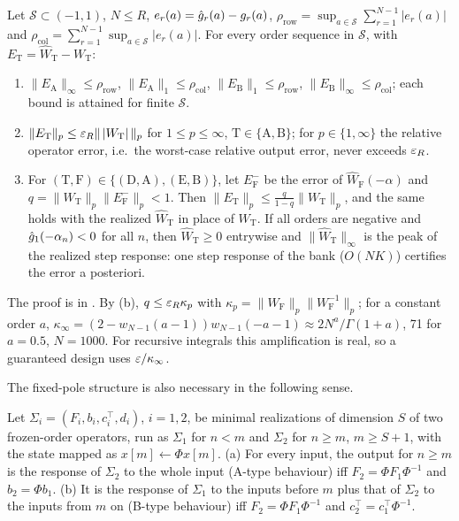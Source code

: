 \begin{theorem}\label{thm:opnorm}
Let $\mathcal S\subset(-1,1)$, $N\le R$, $e_r(a)=\hat g_r(a)-g_r(a)$, $\rho_{\mathrm{row}}=\sup_{a\in\mathcal S}\sum_{r=1}^{N-1}|e_r(a)|$ and $\rho_{\mathrm{col}}=\sum_{r=1}^{N-1}\sup_{a\in\mathcal S}|e_r(a)|$. For every order sequence in $\mathcal S$, with $E_{\mathrm T}=\hat W_{\mathrm T}-W_{\mathrm T}$:
\begin{enumerate}
\item[(a)] $\|E_{\mathrm A}\|_\infty\le\rho_{\mathrm{row}}$, $\|E_{\mathrm A}\|_1\le\rho_{\mathrm{col}}$, $\|E_{\mathrm B}\|_1\le\rho_{\mathrm{row}}$, $\|E_{\mathrm B}\|_\infty\le\rho_{\mathrm{col}}$; each bound is attained for finite $\mathcal S$.
\item[(b)] $\|E_{\mathrm T}\|_p\le\varepsilon_R\|\,|W_{\mathrm T}|\,\|_p$ for $1\le p\le\infty$, $\mathrm T\in\{\mathrm A,\mathrm B\}$; for $p\in\{1,\infty\}$ the relative operator error, i.e.\ the worst-case relative output error, never exceeds $\varepsilon_R$.
\item[(c)] For $(\mathrm T,\mathrm F)\in\{(\mathrm D,\mathrm A),(\mathrm E,\mathrm B)\}$, let $E^-_{\mathrm F}$ be the error of $\hat W_{\mathrm F}(-\alpha)$ and $q=\|W_{\mathrm T}\|_p\|E^-_{\mathrm F}\|_p<1$. Then $\|E_{\mathrm T}\|_p\le\frac{q}{1-q}\|W_{\mathrm T}\|_p$, and the same holds with the realized $\hat W_{\mathrm T}$ in place of $W_{\mathrm T}$. If all orders are negative and $\hat g_1(-\alpha_n)<0$ for all $n$, then $\hat W_{\mathrm T}\ge0$ entrywise and $\|\hat W_{\mathrm T}\|_\infty$ is the peak of the realized step response: one step response of the bank ($O(NK)$) certifies the error a posteriori.
\end{enumerate}
\end{theorem}

The proof is in . By (b), $q\le\varepsilon_R\kappa_p$ with $\kappa_p=\|W_{\mathrm F}\|_p\|W_{\mathrm F}^{-1}\|_p$; for a constant order $a$, $\kappa_\infty=(2-w_{N-1}(a-1))w_{N-1}(-a-1)\approx2N^a/\Gamma(1+a)$, 71 for $a=0.5$, $N=1000$. For recursive integrals this amplification is real, so a guaranteed design uses $\varepsilon/\kappa_\infty$.

The fixed-pole structure is also necessary in the following sense.

\begin{theorem}[Necessity]\label{thm:necessity}
Let $\Sigma_i=(F_i,b_i,c_i^{\top},d_i)$, $i=1,2$, be minimal realizations of dimension $S$ of two frozen-order operators, run as $\Sigma_1$ for $n<m$ and $\Sigma_2$ for $n\ge m$, $m\ge S+1$, with the state mapped as $x[m]\leftarrow\Phi x[m]$.
(a) For every input, the output for $n\ge m$ is the response of $\Sigma_2$ to the whole input (A-type behaviour) iff $F_2=\Phi F_1\Phi^{-1}$ and $b_2=\Phi b_1$.
(b) It is the response of $\Sigma_1$ to the inputs before $m$ plus that of $\Sigma_2$ to the inputs from $m$ on (B-type behaviour) iff $F_2=\Phi F_1\Phi^{-1}$ and $c_2^{\top}=c_1^{\top}\Phi^{-1}$.
\end{theorem}

